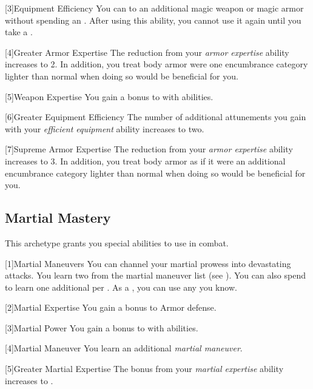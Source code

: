         [3]{Equipment Efficiency} You can  to an additional magic weapon or magic armor without spending an .
        After using this ability, you cannot use it again until you take a .

        [4]{Greater Armor Expertise}
        The  reduction from your \textit{armor expertise} ability increases to 2.
        In addition, you treat body armor were one encumbrance category lighter than normal when doing so would be beneficial for you.

        [5]{Weapon Expertise} You gain a  bonus to  with  abilities.

        [6]{Greater Equipment Efficiency} The number of additional attunements you gain with your \textit{efficient equipment} ability increases to two.

        [7]{Supreme Armor Expertise}
        The  reduction from your \textit{armor expertise} ability increases to 3.
        In addition, you treat body armor as if it were an additional encumbrance category lighter than normal when doing so would be beneficial for you.

    \subsection{Martial Mastery}
        This archetype grants you special abilities to use in combat.

        [1]{Martial Maneuvers}
        You can channel your martial prowess into devastating attacks.
        You learn two  from the martial maneuver list (see ).
        You can also spend  to learn one additional  per .
        As a , you can use any  you know.

        [2]{Martial Expertise} You gain a  bonus to Armor defense.

        [3]{Martial Power} You gain a  bonus to  with  abilities.

        [4]{Martial Maneuver}
        You learn an additional \textit{martial maneuver}.

        [5]{Greater Martial Expertise} The bonus from your \textit{martial expertise} ability increases to .


